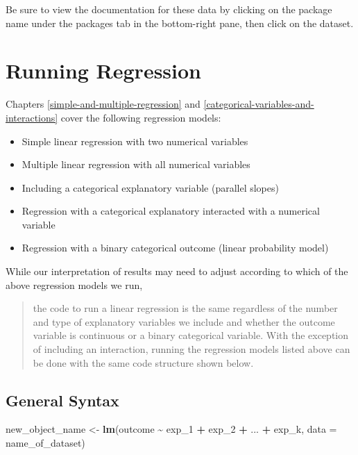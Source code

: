 \documentclass[
]{book}
\makeatletter
\newenvironment{Shaded}{\begin{snugshade}}{\end{snugshade}}
\newcommand{\AttributeTok}[1]{\textcolor[rgb]{0.27,0.27,0.27}{#1}}
\newcommand{\FunctionTok}[1]{\textcolor[rgb]{0.27,0.27,0.27}{\textbf{#1}}}
\newcommand{\NormalTok}[1]{#1}
\newcommand{\OtherTok}[1]{\textcolor[rgb]{0.37,0.37,0.37}{#1}}
\newcommand{\SpecialCharTok}[1]{\textcolor[rgb]{0.43,0.43,0.43}{\textbf{#1}}}
\providecommand{\tightlist}{%
  \setlength{\itemsep}{0pt}\setlength{\parskip}{0pt}}
\newenvironment{kframe}{%
\medskip{}
\setlength{\fboxsep}{.8em}
 \def\at@end@of@kframe{}%
 \ifinner\ifhmode%
  \def\at@end@of@kframe{\end{minipage}}%
  \begin{minipage}{\columnwidth}%
 \fi\fi%
 \def\FrameCommand##1{\hskip\@totalleftmargin \hskip-\fboxsep
 \colorbox{shadecolor}{##1}\hskip-\fboxsep
     \hskip-\linewidth \hskip-\@totalleftmargin \hskip\columnwidth}%
 \MakeFramed {\advance\hsize-\width
   \@totalleftmargin\z@ \linewidth\hsize
   \@setminipage}}%
 {\par\unskip\endMakeFramed%
 \at@end@of@kframe}
\renewenvironment{Shaded}{\begin{kframe}}{\end{kframe}}
\makeatother
\begin{document}
Be sure to view the documentation for these data by clicking on the package name under the packages tab in the bottom-right pane, then click on the dataset.

\hypertarget{running-regression}{%
\section{Running Regression}\label{running-regression}}

Chapters \ref{simple-and-multiple-regression} and \ref{categorical-variables-and-interactions} cover the following regression models:

\begin{itemize}
\tightlist
\item
  Simple linear regression with two numerical variables
\item
  Multiple linear regression with all numerical variables
\item
  Including a categorical explanatory variable (parallel slopes)
\item
  Regression with a categorical explanatory interacted with a numerical variable
\item
  Regression with a binary categorical outcome (linear probability model)
\end{itemize}

While our interpretation of results may need to adjust according to which of the above regression models we run,

\begin{quote}
the code to run a linear regression is the same regardless of the number and type of explanatory variables we include and whether the outcome variable is continuous or a binary categorical variable. With the exception of including an interaction, running the regression models listed above can be done with the same code structure shown below.
\end{quote}

\hypertarget{general-syntax}{%
\subsection{General Syntax}\label{general-syntax}}

\begin{Shaded}
\begin{Highlighting}[]
\NormalTok{new\_object\_name }\OtherTok{\textless{}{-}} \FunctionTok{lm}\NormalTok{(outcome }\SpecialCharTok{\textasciitilde{}}\NormalTok{ exp\_1 }\SpecialCharTok{+}\NormalTok{ exp\_2 }\SpecialCharTok{+}\NormalTok{ ... }\SpecialCharTok{+}\NormalTok{ exp\_k, }\AttributeTok{data =}\NormalTok{ name\_of\_dataset)}
\end{Highlighting}
\end{Shaded}
\end{document}
